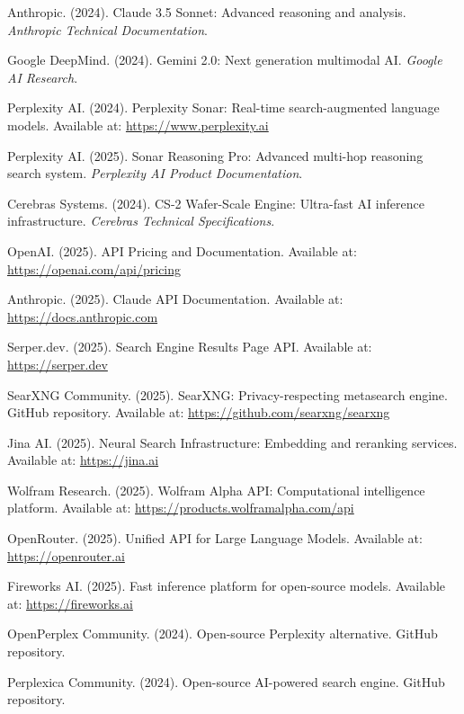 \documentclass[12pt,a4paper]{article}
\begin{document}
\begin{thebibliography}{99}
Anthropic. (2024). Claude 3.5 Sonnet: Advanced reasoning and analysis. \textit{Anthropic Technical Documentation}.

Google DeepMind. (2024). Gemini 2.0: Next generation multimodal AI. \textit{Google AI Research}.

Perplexity AI. (2024). Perplexity Sonar: Real-time search-augmented language models. Available at: \url{https://www.perplexity.ai}

Perplexity AI. (2025). Sonar Reasoning Pro: Advanced multi-hop reasoning search system. \textit{Perplexity AI Product Documentation}.

Cerebras Systems. (2024). CS-2 Wafer-Scale Engine: Ultra-fast AI inference infrastructure. \textit{Cerebras Technical Specifications}.

OpenAI. (2025). API Pricing and Documentation. Available at: \url{https://openai.com/api/pricing}

Anthropic. (2025). Claude API Documentation. Available at: \url{https://docs.anthropic.com}

Serper.dev. (2025). Search Engine Results Page API. Available at: \url{https://serper.dev}

SearXNG Community. (2025). SearXNG: Privacy-respecting metasearch engine. GitHub repository. Available at: \url{https://github.com/searxng/searxng}

Jina AI. (2025). Neural Search Infrastructure: Embedding and reranking services. Available at: \url{https://jina.ai}

Wolfram Research. (2025). Wolfram Alpha API: Computational intelligence platform. Available at: \url{https://products.wolframalpha.com/api}

OpenRouter. (2025). Unified API for Large Language Models. Available at: \url{https://openrouter.ai}

Fireworks AI. (2025). Fast inference platform for open-source models. Available at: \url{https://fireworks.ai}

OpenPerplex Community. (2024). Open-source Perplexity alternative. GitHub repository.

Perplexica Community. (2024). Open-source AI-powered search engine. GitHub repository.


\end{thebibliography}
\end{document}
